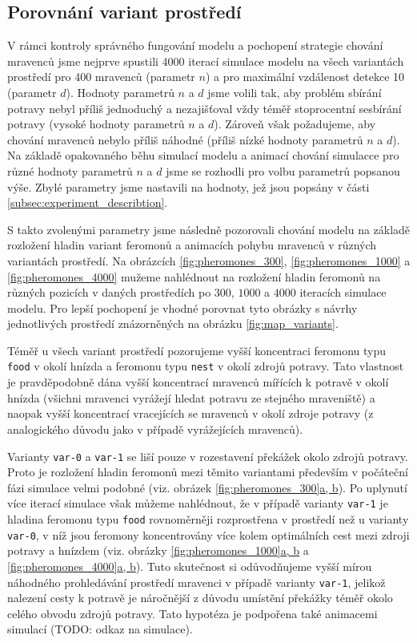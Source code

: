 \documentclass[10pt,a4paper,twocolumn]{article}
\begin{document}
\subsection{Porovnání variant prostředí}
\label{subsec:variant_comparision}

V rámci kontroly správného fungování modelu a pochopení strategie chování 
mravenců jsme nejprve spustili 4000 iterací simulace modelu na všech 
variantách prostředí pro 400 mravenců (parametr $n$) a pro maximální
vzdálenost detekce 10 (parametr $d$). Hodnoty parametrů $n$ a $d$ 
jsme volili tak, aby problém sbírání
potravy nebyl příliš jednoduchý a nezajišťoval vždy téměř stoprocentní
sesbírání potravy (vysoké hodnoty parametrů $n$ a $d$). Zároveň však
požadujeme, aby chování mravenců nebylo příliš náhodné 
(příliš nízké hodnoty parametrů $n$ a $d$). Na základě opakovaného 
běhu simulací modelu a animací chování simulacce pro různé hodnoty 
parametrů $n$ a $d$ jsme se rozhodli pro volbu parametrů popsanou výše. 
Zbylé parametry jsme nastavili na hodnoty, jež jsou popsány v části 
\ref{subsec:experiment_describtion}. 

S takto zvolenými parametry jsme následně pozorovali chování modelu na základě 
rozložení hladin variant feromonů a animacích pohybu mravenců v různých 
variantách prostředí. Na obrázcích \ref{fig:pheromones_300}, 
\ref{fig:pheromones_1000} a \ref{fig:pheromones_4000} 
mužeme nahlédnout na rozložení hladin feromonů na 
různých pozicích v daných prostředích po $300$, $1000$ a $4000$ 
iteracích simulace modelu. Pro lepší pochopení je vhodné porovnat 
tyto obrázky s návrhy jednotlivých prostředí znázorněných na obrázku
\ref{fig:map_variants}.

Téměř u všech variant prostředí pozorujeme vyšší koncentraci feromonu typu
\texttt{food} v okolí hnízda a feromonu typu \texttt{nest} v 
okolí zdrojů potravy. Tato vlastnost je pravděpodobně dána 
vyšší koncentrací mravenců mířících k potravě v okolí hnízda 
(všichni mravenci vyrážejí hledat potravu ze stejného mraveniště) a 
naopak vyšší koncentrací vracejících se mravenců v okolí zdroje
potravy (z analogického důvodu jako v případě vyrážejících mravenců).

Varianty \texttt{var-0} a \texttt{var-1} se liší pouze v rozestavení 
překážek okolo zdrojů potravy. Proto je rozložení hladin feromonů mezi
těmito variantami především v počáteční fázi simulace velmi podobné
(viz. obrázek \hyperref[fig:pheromones_300]{\ref*{fig:pheromones_300}a, b}). 
Po uplynutí více iterací 
simulace však můžeme nahlédnout, že v případě varianty \texttt{var-1}
je hladina feromonu typu \texttt{food} 
rovnoměrněji rozprostřena v prostředí než u
varianty \texttt{var-0}, v níž jsou feromony koncentrovány více kolem optimálních
cest mezi zdroji potravy a hnízdem (viz. obrázky 
\hyperref[fig:pheromones_1000]{\ref*{fig:pheromones_1000}a, b}
a \hyperref[fig:pheromones_4000]{\ref*{fig:pheromones_4000}a, b}). 
Tuto skutečnost
si odůvodňujeme vyšší mírou náhodného prohledávání prostředí mravenci
v případě varianty \texttt{var-1}, jelikož nalezení cesty k potravě
je náročnější z důvodu umístění překážky téměř okolo celého obvodu
zdrojů potravy. Tato hypotéza je podpořena také animacemi simulací 
(TODO: odkaz na simulace).
\end{document}
